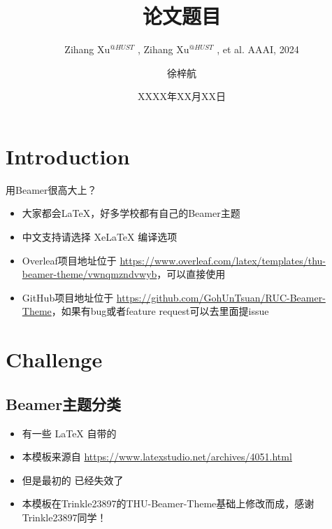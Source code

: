 \documentclass{beamer}
\author{徐梓航}
\title{论文题目}
\subtitle{
    \scriptsize
    Zihang Xu\scriptsize\texorpdfstring{$^{@HUST}$}{\textit{@HUST}}
    \normalfont
    , Zihang Xu\scriptsize\texorpdfstring{$^{@HUST}$}{\textit{@HUST}}
    \normalfont
    , et al. AAAI, 2024
}
\institute{华中科技大学计算机科学与技术学院}
\date{XXXX年XX月XX日}
\begin{document}

\begin{frame}
    \titlepage
\end{frame}

\begin{frame}
    \tableofcontents[sectionstyle=show,subsectionstyle=show/shaded/hide,subsubsectionstyle=show/shaded/hide]
\end{frame}

\section{Introduction}

\begin{frame}{用Beamer很高大上？}
    \begin{itemize}[<+-|alert@+>] %
        \item 大家都会\LaTeX{}，好多学校都有自己的Beamer主题
        \item 中文支持请选择 Xe\LaTeX{} 编译选项
        \item Overleaf项目地址位于 \url{https://www.overleaf.com/latex/templates/thu-beamer-theme/vwnqmzndvwyb}，可以直接使用
        \item GitHub项目地址位于 \url{https://github.com/GohUnTsuan/RUC-Beamer-Theme}，如果有bug或者feature request可以去里面提issue
    \end{itemize}
\end{frame}

\section{Challenge}

\subsection{Beamer主题分类}

\begin{frame}
    \begin{itemize}
        \item 有一些 \LaTeX{} 自带的
        \item 本模板来源自 \newline \url{https://www.latexstudio.net/archives/4051.html}
        \item 但是最初的 \href{http://far.tooold.cn/post/latex/beamertsinghua}{\color{purple}{link}} 已经失效了
        \item 本模板在Trinkle23897的THU-Beamer-Theme基础上修改而成，感谢Trinkle23897同学！\href{https://github.com/Trinkle23897/THU-Beamer-Theme}{\color{red}{戳我}}
    \end{itemize}
\end{frame}
\end{document}
